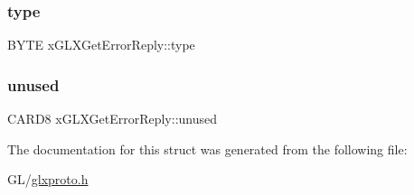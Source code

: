 \subsubsection{\texorpdfstring{type}{type}}
{\footnotesize\ttfamily B\+Y\+TE x\+G\+L\+X\+Get\+Error\+Reply\+::type}

\mbox{\label{structx_g_l_x_get_error_reply_aedaec7cad26ee9826e380a3e03f2a61f}} 
\subsubsection{\texorpdfstring{unused}{unused}}
{\footnotesize\ttfamily C\+A\+R\+D8 x\+G\+L\+X\+Get\+Error\+Reply\+::unused}



The documentation for this struct was generated from the following file\+:\begin{DoxyCompactItemize}
\item 
G\+L/\hyperlink{glxproto_8h}{glxproto.\+h}\end{DoxyCompactItemize}
